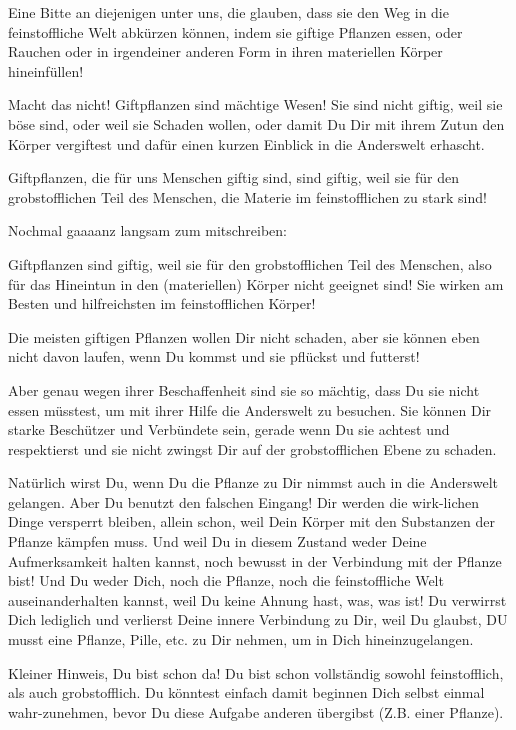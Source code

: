 \documentclass[11pt,titlepage,a5paper]{book}
\begin{document}
Eine Bitte an diejenigen unter uns, die glauben, dass sie den Weg in die feinstoffliche Welt abkürzen können, indem sie giftige Pflanzen essen, oder Rauchen oder in irgendeiner anderen Form in ihren materiellen Körper hineinfüllen!

Macht das nicht! Giftpflanzen sind mächtige Wesen! Sie sind nicht giftig, weil sie böse sind, oder weil sie Schaden wollen, oder damit Du Dir mit ihrem Zutun den Körper vergiftest und dafür einen kurzen Einblick in die Anderswelt erhascht.

Giftpflanzen, die für uns Menschen giftig sind, sind giftig, weil sie für den grobstofflichen Teil des Menschen, die Materie im feinstofflichen zu stark sind!

Nochmal gaaaanz langsam zum mitschreiben: \begin{Large}
Giftpflanzen sind giftig, weil sie für den grobstofflichen Teil des Menschen, also für das Hineintun in den (materiellen) Körper nicht geeignet sind! Sie wirken am Besten und hilfreichsten im feinstofflichen Körper!
\end{Large}

Die meisten giftigen Pflanzen wollen Dir nicht schaden, aber sie können eben nicht davon laufen, wenn Du kommst und sie pflückst und futterst!

Aber genau wegen ihrer Beschaffenheit sind sie so mächtig, dass Du sie nicht essen müsstest, um mit ihrer Hilfe die Anderswelt zu besuchen. Sie können Dir starke Beschützer und Verbündete sein, gerade wenn Du sie achtest und respektierst und sie nicht zwingst Dir auf der grobstofflichen Ebene zu schaden.

Natürlich wirst Du, wenn Du die Pflanze zu Dir nimmst auch in die Anderswelt gelangen. Aber Du benutzt den falschen Eingang! Dir werden die wirk-lichen Dinge versperrt bleiben, allein schon, weil Dein Körper mit den Substanzen der Pflanze kämpfen muss. Und weil Du in diesem Zustand weder Deine Aufmerksamkeit halten kannst, noch bewusst in der Verbindung mit der Pflanze bist! Und Du weder Dich, noch die Pflanze, noch die feinstoffliche Welt auseinanderhalten kannst, weil Du keine Ahnung hast, was, was ist! Du verwirrst Dich lediglich und verlierst Deine innere Verbindung zu Dir, weil Du glaubst, DU musst eine Pflanze, Pille, etc. zu Dir nehmen, um in Dich hineinzugelangen. 

Kleiner Hinweis, Du bist schon da! Du bist schon vollständig sowohl feinstofflich, als auch grobstofflich. Du könntest einfach damit beginnen Dich selbst einmal wahr-zunehmen, bevor Du diese Aufgabe anderen übergibst (Z.B. einer Pflanze).
\end{document}
